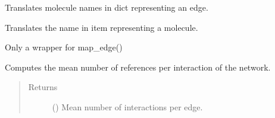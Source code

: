 \documentclass[letterpaper,10pt,english]{sphinxmanual}
\begin{document}
\begin{fulllineitems}
\begin{fulllineitems}
\begin{quote}
\begin{description}
\begin{itemize}
\end{itemize}


\end{description}\end{quote}

\end{fulllineitems}


\begin{fulllineitems}
\label{\detokenize{main:pypath.main.PyPath.loop_edges}}
\end{fulllineitems}


\begin{fulllineitems}
\label{\detokenize{main:pypath.main.PyPath.map_edge}}
Translates molecule names in dict representing an edge.

\end{fulllineitems}


\begin{fulllineitems}
\label{\detokenize{main:pypath.main.PyPath.map_item}}
Translates the name in item representing a molecule.

\end{fulllineitems}


\begin{fulllineitems}
\label{\detokenize{main:pypath.main.PyPath.map_list}}
Only a wrapper for map\_edge()

\end{fulllineitems}


\begin{fulllineitems}
\label{\detokenize{main:pypath.main.PyPath.mean_reference_per_interaction}}
Computes the mean number of references per interaction of the
network.
\begin{quote}\begin{description}
\item[{Returns}] \leavevmode
() \textendash{} Mean number of interactions per edge.


\end{description}
\end{quote}
\end{fulllineitems}
\end{fulllineitems}
\end{document}

